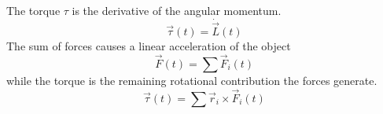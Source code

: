 \documentclass[12pt,a4paper,twoside]{article}
\begin{document}
The torque $\tau$ is the derivative of the angular momentum.
\begin{equation*}
  \vec{\tau}(t) = \dot{\vec{L}}(t)
\end{equation*}
The sum of forces causes a linear acceleration of the object
\begin{equation*}
  \vec{F}(t) = \sum \vec{F}_i(t)
\end{equation*}
while the torque is the remaining rotational contribution the forces generate.
\begin{equation*}
  \vec{\tau}(t) = \sum \vec{r}_i \times \vec{F}_i(t)
\end{equation*}

\end{document}
